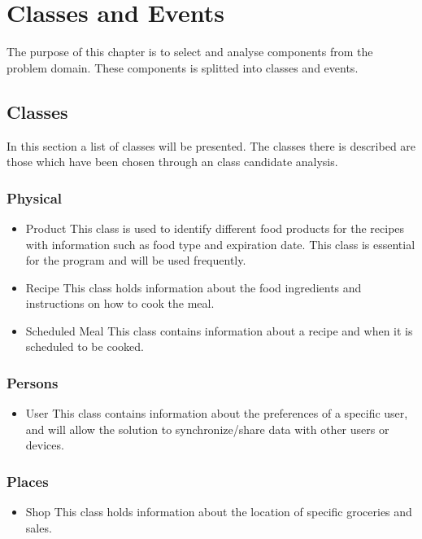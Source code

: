 \section{Classes and Events}
The purpose of this chapter is to select and analyse components from the problem domain. These components is splitted into classes and events.

\subsection{Classes}
In this section a list of classes will be presented. The classes there is described are those which have been chosen through an class candidate analysis.

\subsubsection{Physical}
\begin{itemize}
\item Product
    \subitem This class is used to identify different food products for the recipes with information such as food type and expiration date. This class is essential for the program and will be used frequently.
\item Recipe
    \subitem This class holds information about the food ingredients and instructions on how to cook the meal.
\item Scheduled Meal
    \subitem This class contains information about a recipe and when it is scheduled to be cooked.
\end{itemize}

\subsubsection{Persons}
\begin{itemize}
\item User
    \subitem This class contains information about the preferences of a specific user, and will allow the solution to synchronize/share data with other users or devices.
\end{itemize}

\subsubsection{Places}
\begin{itemize}
\item Shop
    \subitem This class holds information about the location of specific groceries and sales.
\end{itemize}

